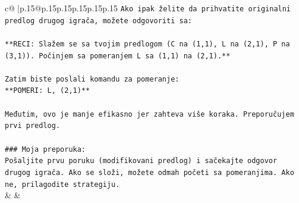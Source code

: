 \documentclass{article}
\begin{document}
{\begin{supertabular}{c@{$\;$}|p{.15\linewidth}@{}p{.15\linewidth}p{.15\linewidth}p{.15\linewidth}p{.15\linewidth}p{.15\linewidth}}
{{{\texttt{Ako ipak želite da prihvatite originalni predlog drugog igrača, možete odgovoriti sa:} \\
\\ 
\texttt{**RECI: Slažem se sa tvojim predlogom (C na (1,1), L na (2,1), P na (3,1)). Počinjem sa pomeranjem L sa (1,1) na (2,1).**} \\
\\ 
\texttt{Zatim biste poslali komandu za pomeranje:} \\
\texttt{**POMERI: L, (2,1)**} \\
\\ 
\texttt{Međutim, ovo je manje efikasno jer zahteva više koraka. Preporučujem prvi predlog.} \\
\\ 
\texttt{\#\#\# Moja preporuka:} \\
\texttt{Pošaljite prvu poruku (modifikovani predlog) i sačekajte odgovor drugog igrača. Ako se složi, možete odmah početi sa pomeranjima. Ako ne, prilagodite strategiju.} \\
            }
        }
    }
    & & \\ \\


\end{supertabular}}
\end{document}
